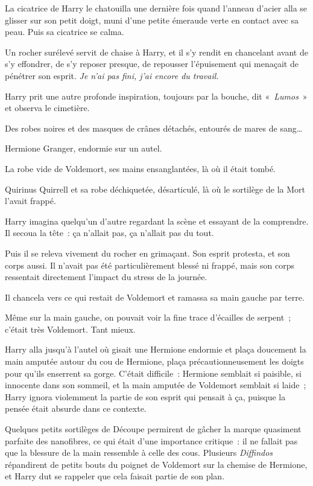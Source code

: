 La cicatrice de Harry le chatouilla une dernière fois quand l'anneau d'acier alla se glisser sur son petit doigt, muni d'une petite émeraude verte en contact avec sa peau.
Puis sa cicatrice se calma.

Un rocher surélevé servit de chaise à Harry, et il s'y rendit en chancelant avant de s'y effondrer, de s'y reposer presque, de repousser l'épuisement qui menaçait de pénétrer son esprit.
\emph{Je n'ai pas fini, j'ai encore du travail.}

Harry prit une autre profonde inspiration, toujours par la bouche, dit «~\emph{Lumos}~» et observa le cimetière.

Des robes noires et des masques de crânes détachés, entourés de mares de sang…

Hermione Granger, endormie sur un autel.

La robe vide de Voldemort, ses mains ensanglantées, là où il était tombé.

Quirinus Quirrell et sa robe déchiquetée, désarticulé, là où le sortilège de la Mort l'avait frappé.

Harry imagina quelqu'un d'autre regardant la scène et essayant de la comprendre.
Il secoua la tête~: ça n'allait pas, ça n'allait pas du tout.

Puis il se releva vivement du rocher en grimaçant.
Son esprit protesta, et son corps aussi.
Il n'avait pas été particulièrement blessé ni frappé, mais son corps ressentait directement l'impact du stress de la journée.

Il chancela vers ce qui restait de Voldemort et ramassa sa main gauche par terre.

Même sur la main gauche, on pouvait voir la fine trace d'écailles de serpent~; c'était très Voldemort.
Tant mieux.

Harry alla jusqu'à l'autel où gisait une Hermione endormie et plaça doucement la main amputée autour du cou de Hermione, plaça précautionneusement les doigts pour qu'ils enserrent sa gorge.
C'était difficile~: Hermione semblait si paisible, si innocente dans son sommeil, et la main amputée de Voldemort semblait si laide~; Harry ignora violemment la partie de son esprit qui pensait à ça, puisque la pensée était absurde dans ce contexte.

Quelques petits sortilèges de Découpe permirent de gâcher la marque quasiment parfaite des nanofibres, ce qui était d'une importance critique~: il ne fallait pas que la blessure de la main ressemble à celle des cous.
Plusieurs \emph{Diffindos} répandirent de petits bouts du poignet de Voldemort sur la chemise de Hermione, et Harry dut se rappeler que cela faisait partie de son plan.

